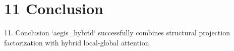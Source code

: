 \section{11 Conclusion}

 11. Conclusion
`aegis\_hybrid` successfully combines structural projection factorization with hybrid local-global attention.
